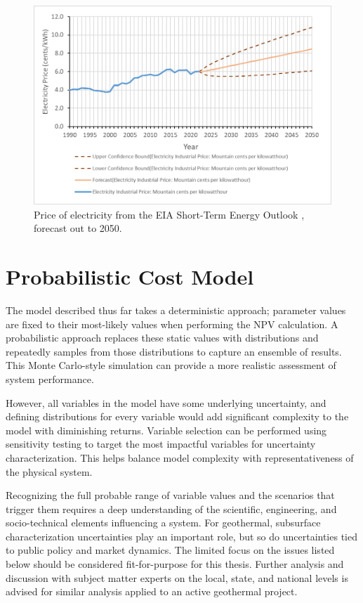 \begin{figure}[!htp]
\centering
\includegraphics[width=.8\textwidth]{templates/images/Figure-EIA_Electricity_Forecast.png}
\caption[Electricity price forecast]{Price of electricity from the EIA Short-Term Energy Outlook \protect\citep{eia_short-term_2021}, forecast out to 2050.}
\label{fig:electricity_pricing}
\end{figure}

\section{Probabilistic Cost Model}\label{ch4:cm_uncertainties}
The model described thus far takes a deterministic approach; parameter values are fixed to their most-likely values when performing the NPV calculation. A probabilistic approach replaces these static values with distributions and repeatedly samples from those distributions to capture an ensemble of results. This Monte Carlo-style simulation can provide a more realistic assessment of system performance.

However, all variables in the model have some underlying uncertainty, and defining distributions for every variable would add significant complexity to the model with diminishing returns. Variable selection can be performed using sensitivity testing to target the most impactful variables for uncertainty characterization. This helps balance model complexity with representativeness of the physical system. 

Recognizing the full probable range of variable values and the scenarios that trigger them requires a deep understanding of the scientific, engineering, and socio-technical elements influencing a system. For geothermal, subsurface characterization uncertainties play an important role, but so do uncertainties tied to public policy and market dynamics. The limited focus on the issues listed below should be considered fit-for-purpose for this thesis. Further analysis and discussion with subject matter experts on the local, state, and national levels is advised for similar analysis applied to an active geothermal project.

